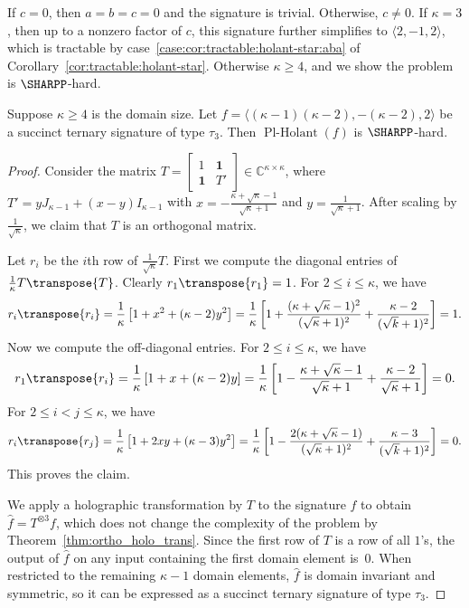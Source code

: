 \documentclass[11pt]{article}
\newcommand{\PlHolant}{\operatorname{Pl-Holant}}
\begin{document}
If $c = 0$, then $a = b = c = 0$ and the signature is trivial.
Otherwise, $c \ne 0$.
If $\kappa = 3$,
then up to a nonzero factor of $c$,
this signature further simplifies to $\langle 2,-1,2 \rangle$,
which is tractable by case~\ref{case:cor:tractable:holant-star:aba} of Corollary~\ref{cor:tractable:holant-star}.
Otherwise $\kappa \ge 4$,
and we show the problem is $\SHARPP$-hard.

\begin{lemma} \label{lem:unary:<(k-1)(k-2),-(k-2),2>}
 Suppose $\kappa \ge 4$ is the domain size.
 Let $f = \langle (\kappa - 1) (\kappa - 2), -(\kappa - 2), 2 \rangle$ be a succinct ternary signature of type $\tau_3$.
 Then $\PlHolant(f)$ is $\SHARPP$-hard.
\end{lemma}

\begin{proof}
 Consider the matrix $T = \left[\begin{smallmatrix} 1 & \mathbf{1} \\ \mathbf{1} & T' \end{smallmatrix}\right] \in \mathbb{C}^{\kappa \times \kappa}$,
 where $T' = y J_{\kappa-1} + (x - y) I_{\kappa-1}$
 with $x = -\frac{\kappa + \sqrt{\kappa} - 1}{\sqrt{\kappa} + 1}$
 and $y = \frac{1}{\sqrt{\kappa} + 1}$.
 After scaling by $\frac{1}{\sqrt{\kappa}}$,
 we claim that $T$ is an orthogonal matrix.
 
 Let $r_i$ be the $i$th row of $\frac{1}{\sqrt{\kappa}} T$.
 First we compute the diagonal entries of $\frac{1}{\kappa} T \transpose{T}$.
 Clearly $r_1 \transpose{r_1} = 1$.
 For $2 \le i \le \kappa$,
 we have
 \[
  r_i \transpose{r_i}
  = \frac{1}{\kappa} \left[1 + x^2 + (\kappa - 2) y^2\right]
  = \frac{1}{\kappa} \left[1 + \frac{(\kappa + \sqrt{\kappa} - 1)^2}{(\sqrt{\kappa} + 1)^2} + \frac{\kappa - 2}{(\sqrt{k} + 1)^2}\right]
  = 1.
 \]
 Now we compute the off-diagonal entries.
 For $2 \le i \le \kappa$,
 we have
 \[
  r_1 \transpose{r_i}
  = \frac{1}{\kappa} \left[1 + x + (\kappa - 2) y\right]
  = \frac{1}{\kappa} \left[1 - \frac{\kappa + \sqrt{\kappa} - 1}{\sqrt{\kappa} + 1} + \frac{\kappa - 2}{\sqrt{\kappa} + 1}\right]
  = 0.
 \]
 For $2 \le i < j \le \kappa$,
 we have
 \[
  r_i \transpose{r_j}
  = \frac{1}{\kappa} \left[1 + 2 x y + (\kappa - 3) y^2\right]
  = \frac{1}{\kappa} \left[1 - \frac{2 (\kappa + \sqrt{\kappa} - 1)}{(\sqrt{\kappa} + 1)^2} + \frac{\kappa - 3}{(\sqrt{k} + 1)^2}\right]
  = 0.
 \]
 This proves the claim.

 We apply a holographic transformation by $T$ to the signature $f$ to obtain $\widehat{f} = T^{\otimes 3} f$,
 which does not change the complexity of the problem by Theorem~\ref{thm:ortho_holo_trans}.
 Since the first row of $T$ is a row of all $1$'s,
 the output of $\widehat{f}$ on any input containing the first domain element is~$0$.
 When restricted to the remaining $\kappa - 1$ domain elements,
 $\widehat{f}$ is domain invariant and symmetric,
 so it can be expressed as a succinct ternary signature of type $\tau_3$.
 

\end{proof}
\end{document}
